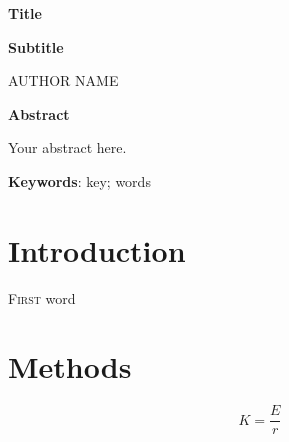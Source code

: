 \documentclass[12pt]{extarticle}
\begin{document}


{\selectfont 
\centerline{\huge{\textbf{Title}}} 
\bigskip
\centerline{\Large{\textbf{Subtitle}}}
}

\bigskip
\bigskip

\centerline{ \Large AUTHOR NAME\footnotemark}


\bigskip
\bigskip
\bigskip

\thispagestyle{fancy}

\bigskip
\bigskip
\bigskip

\noindent \textbf{Abstract}

Your abstract here.

\bigskip

\textbf{Keywords}: key; words

\bigskip
\bigskip
\newpage

\section{Introduction}

\lettrine[lines=3]{F}{irst} word \lipsum[1]

\lipsum[1]

\section{Methods}
\lipsum[1]

\begin{equation}
K = \frac{E}{r}
\end{equation}
\end{document}
